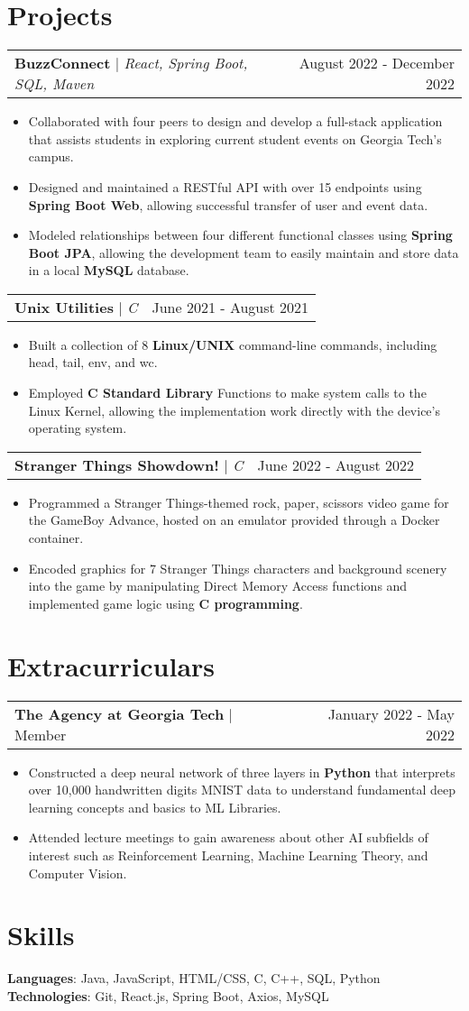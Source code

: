 \documentclass[letterpaper,11pt]{article}
\makeatletter
\newcommand{\resumeExperienceHeading}[3]{
    \begin{tabular*}{0.99\textwidth}[t]{l@{\extracolsep{\fill}}r}
      \textbf{#1} $\vert$ {#2} & {#3} \\
    \end{tabular*}\vspace{-3pt}
}
\newcommand{\resumeProjectHeading}[3]{
    \begin{tabular*}{0.97\textwidth}[t]{l@{\extracolsep{\fill}}r}
      \textbf{#1} $\vert$ \textit{#2}  & {#3}
    \end{tabular*}\vspace{-3pt}
}
\newcommand{\resumeItemListStart}{\begin{itemize}[noitemsep]\vspace{-4pt}}
\newcommand{\resumeItemListEnd}{\end{itemize}}
\makeatother
\begin{document}
\section{Projects}
    \resumeProjectHeading{BuzzConnect}{React, Spring Boot, SQL, Maven}{August 2022 - December 2022}
      \resumeItemListStart
        \item {Collaborated with four peers to design and develop a full-stack application that assists students in exploring current student events on Georgia Tech's campus.}
        \item {Designed and maintained a RESTful API with over 15 endpoints using \textbf{Spring Boot Web}, allowing successful transfer of user and event data.}
        \item {Modeled relationships between four different functional classes using \textbf{Spring Boot JPA}, allowing the development team to easily maintain and store data in a local \textbf{MySQL} database.}
      \resumeItemListEnd

    \resumeProjectHeading{Unix Utilities}{C}{June 2021 - August 2021}
      \resumeItemListStart
        \item {Built a collection of 8 \textbf{Linux/UNIX} command-line commands, including head, tail, env, and wc.}
        \item {Employed \textbf{C Standard Library} Functions to make system calls to the Linux Kernel, allowing the implementation work directly with the device's operating system.}
      \resumeItemListEnd

    \resumeProjectHeading{Stranger Things Showdown!}{C}{June 2022 - August 2022}
      \resumeItemListStart
        \item {Programmed a Stranger Things-themed rock, paper, scissors video game for the GameBoy Advance, hosted on an emulator provided through a Docker container.}
        \item {Encoded graphics for 7 Stranger Things characters and background scenery into the game by manipulating Direct Memory Access functions and implemented game logic using \textbf{C programming}.}
      \resumeItemListEnd

\section{Extracurriculars}
  \resumeExperienceHeading{The Agency at Georgia Tech}{Member}{January 2022 - May 2022}
    \resumeItemListStart
      \item {Constructed a deep neural network of three layers in \textbf{Python} that interprets over 10,000 handwritten
      digits MNIST data to understand fundamental deep learning concepts and basics to ML Libraries.}
      \item {Attended lecture meetings to gain awareness about other AI subfields of interest such as Reinforcement
      Learning, Machine Learning Theory, and Computer Vision.}
    \resumeItemListEnd
  
\section{Skills}
    \textbf{Languages}{: Java, JavaScript, HTML/CSS, C, C++, SQL, Python} \\
    \textbf{Technologies}{: Git, React.js, Spring Boot, Axios, MySQL}
\end{document}
